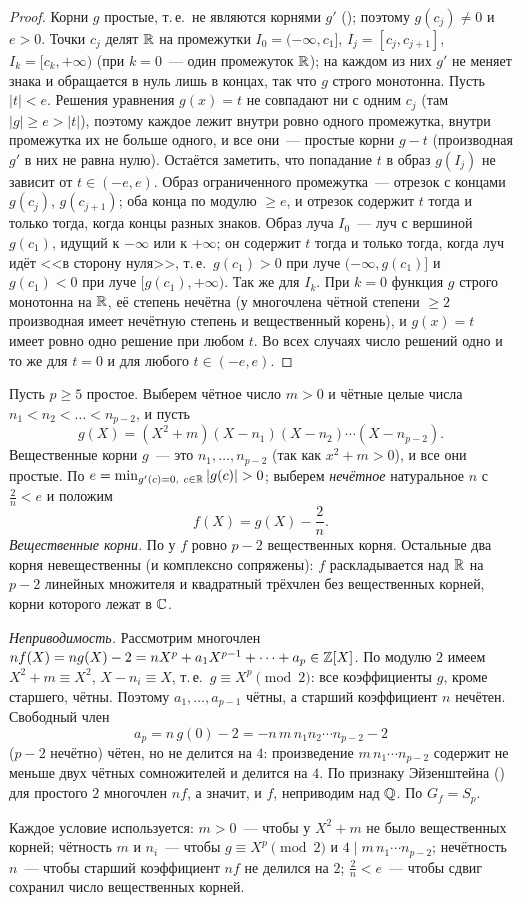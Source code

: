 \begin{proof}
Корни $g$ простые, т.\,е.\ не являются корнями $g'$ (); поэтому $g(c_j)\ne0$ и $e>0$. Точки $c_j$ делят $\mathbb R$ на
промежутки $I_0=(-\infty,c_1]$, $I_j=[c_j,c_{j+1}]$, $I_k=[c_k,+\infty)$ (при $k=0$~--- один промежуток $\mathbb R$); на каждом из
них $g'$ не меняет знака и обращается в нуль лишь в концах, так что $g$ строго монотонна. Пусть $|t|<e$. Решения
уравнения $g(x)=t$ не совпадают ни с одним $c_j$ (там $|g|\ge e>|t|$), поэтому каждое лежит внутри ровно одного
промежутка, внутри промежутка их не больше одного, и все они~--- простые корни $g-t$ (производная $g'$ в них не равна
нулю). Остаётся заметить, что попадание $t$ в образ $g(I_j)$ не зависит от $t\in(-e,e)$. Образ ограниченного
промежутка~--- отрезок с концами $g(c_j)$, $g(c_{j+1})$; оба конца по модулю $\ge e$, и отрезок содержит $t$ тогда и только
тогда, когда концы разных знаков. Образ луча $I_0$~--- луч с вершиной $g(c_1)$, идущий к $-\infty$ или к $+\infty$; он
содержит $t$ тогда и только тогда, когда луч идёт <<в сторону нуля>>, т.\,е.\ $g(c_1)>0$ при луче $(-\infty,g(c_1)]$ и
$g(c_1)<0$ при луче $[g(c_1),+\infty)$. Так же для $I_k$. При $k=0$ функция $g$ строго монотонна на $\mathbb R$, её степень
нечётна (у многочлена чётной степени $\ge2$ производная имеет нечётную степень и вещественный корень), и $g(x)=t$
имеет ровно одно решение при любом $t$. Во всех случаях число решений одно и то же для $t=0$ и для любого $t\in(-e,e)$.
\end{proof}

\begin{example}[4.17]
Пусть $p\ge5$ простое. Выберем чётное число $m>0$ и чётные целые числа $n_1<n_2<\dots<n_{p-2}$, и пусть
\[
g(X)=(X^2+m)(X-n_1)(X-n_2)\cdots(X-n_{p-2}).
\]
Вещественные корни $g$~--- это $n_1,\dots,n_{p-2}$ (так как $x^2+m>0$), и все они простые. По 
$e=\min_{g'(c)=0,\ c\in\R}|g(c)|>0$; выберем \emph{нечётное} натуральное $n$ с $\frac2n<e$ и положим
\[
f(X)=g(X)-\frac2n .
\]
\emph{Вещественные корни.} По  у $f$ ровно $p-2$ вещественных корня. Остальные два корня невещественны (и
комплексно сопряжены): $f$ раскладывается над $\mathbb R$ на $p-2$ линейных множителя и квадратный трёхчлен без вещественных
корней, корни которого лежат в $\mathbb C$.

\emph{Неприводимость.} Рассмотрим многочлен $nf(X)=ng(X)-2=nX^p+a_1X^{p-1}+\dots+a_p\in\mathbb Z[X]$. По модулю $2$ имеем
$X^2+m\equiv X^2$, $X-n_i\equiv X$, т.\,е.\ $g\equiv X^p\pmod 2$: все коэффициенты $g$, кроме старшего, чётны. Поэтому
$a_1,\dots,a_{p-1}$ чётны, а старший коэффициент $n$ нечётен. Свободный член
\[
a_p=n\,g(0)-2=-n\,m\,n_1n_2\cdots n_{p-2}-2
\]
($p-2$ нечётно) чётен, но не делится на $4$: произведение $m\,n_1\cdots n_{p-2}$ содержит не меньше двух чётных
сомножителей и делится на $4$. По признаку Эйзенштейна () для простого $2$ многочлен $nf$, а значит, и $f$,
неприводим над $\mathbb Q$. По  $G_f=S_p$.

Каждое условие используется: $m>0$~--- чтобы у $X^2+m$ не было вещественных корней; чётность $m$ и $n_i$~--- чтобы
$g\equiv X^p\pmod2$ и $4\mid m\,n_1\cdots n_{p-2}$; нечётность $n$~--- чтобы старший коэффициент $nf$ не делился на $2$;
$\frac2n<e$~--- чтобы сдвиг сохранил число вещественных корней.
\end{example}

